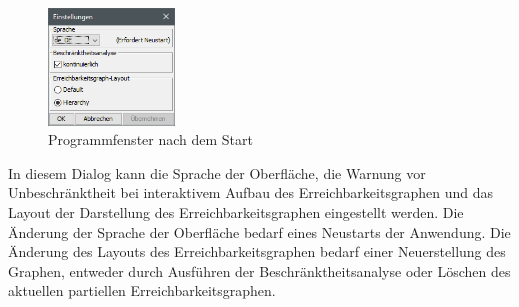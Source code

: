 \begin{figure}[ht]
  \centering
  \includegraphics[width=0.3\textwidth]{../img/settings.png}
  \caption{Programmfenster nach dem Start}
  \label{img:settings}
\end{figure}

In diesem Dialog kann die Sprache der Oberfläche, die Warnung vor
Unbeschränktheit bei interaktivem Aufbau des Erreichbarkeitsgraphen und das
Layout der Darstellung des Erreichbarkeitsgraphen eingestellt werden. Die
Änderung der Sprache der Oberfläche bedarf eines Neustarts der Anwendung. Die
Änderung des Layouts des Erreichbarkeitsgraphen bedarf einer Neuerstellung des
Graphen, entweder durch Ausführen der Beschränktheitsanalyse oder Löschen des
aktuellen partiellen Erreichbarkeitsgraphen.
